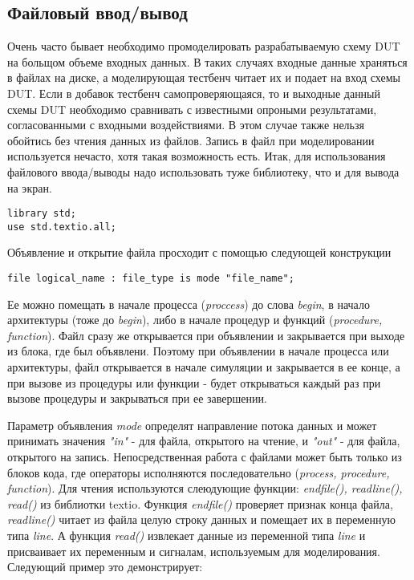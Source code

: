 \subsection{Файловый ввод/вывод}

Очень часто бывает необходимо промоделировать разрабатываемую схему DUT на больщом объеме входных данных. В таких случаях входные данные храняться в файлах на диске, а моделирующая тестбенч читает их и подает на вход схемы DUT. Если в добавок тестбенч самопроверяющаяся, то и выходные данный схемы DUT необходимо сравнивать с известными опроными результатами, согласованными с входными воздействиями. В этом случае также нельзя обойтись без чтения данных из файлов. Запись в файл при моделировании используется нечасто, хотя такая возможность есть. Итак, для использования файлового ввода/выводы надо использовать туже библиотеку, что и для вывода на экран.

\begin{lstlisting}
library std;
use std.textio.all;
\end{lstlisting}

Объявление и открытие файла просходит с помощью следующей конструкции
\begin{lstlisting}
file logical_name : file_type is mode "file_name";
\end{lstlisting}

Ее можно помещать в начале процесса (\emph{proccess}) до слова \emph{begin}, в начало архитектуры (тоже до \emph{begin}), либо в начале процедур и функций (\emph{procedure, function}). Файл сразу же открывается при объявлении и закрывается при выходе из блока, где был объявлени. Поэтому при объявлении в начале процесса или архитектуры, файл открывается в начале симуляции и закрывается в ее конце, а при вызове из процедуры или функции - будет открываться каждый раз при вызове процедуры и закрываться при ее завершении.

Параметр объявления \emph{mode} определят направление потока данных и может принимать значения \emph{"in"} - для файла, открытого на чтение, и \emph{"out"} - для файла, открытого на запись. Непосредственная работа с файлами может быть только из блоков кода, где операторы исполняются последовательно (\emph{process, procedure, function}). Для чтения используются слеюдующие функции: \emph{endfile(), readline(), read()} из библиотки textio. Функция \emph{endfile()} проверяет признак конца файла, \emph{readline()} читает из файла целую строку данных и помещает их в переменную типа \emph{line}. А функция \emph{read()} извлекает данные из переменной типа \emph{line} и присваивает их переменным и сигналам, используемым для моделирования. Следующий пример это демонстрирует:

